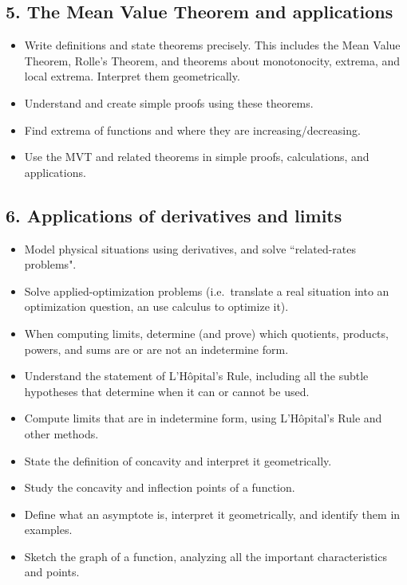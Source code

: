 \documentclass[11pt]{article}
\begin{document}
\subsection{5. The Mean Value Theorem and applications} \label{unit5}

	\begin{itemize}
		\item  Write definitions and state theorems precisely.  This includes the Mean Value Theorem, Rolle's Theorem, and theorems about monotonocity, extrema, and local extrema.  Interpret them geometrically.
		
		\item  Understand and create simple proofs using these theorems.
		
		\item   Find extrema of functions and where they are increasing/decreasing.
		
		\item Use the MVT and related theorems in simple proofs, calculations, and applications.
	\end{itemize}

\subsection{6. Applications of derivatives and limits} \label{unit6}

	\begin{itemize}
		\item  Model physical situations using derivatives, and solve ``related-rates problems".  
		\item  Solve applied-optimization problems (i.e.\ translate a real situation into an optimization question, an use calculus to optimize it).
		\item When computing limits, determine (and prove) which quotients, products, powers, and sums are or are not an indetermine form.
		\item Understand the statement of L'H\^{o}pital's Rule, including all the subtle hypotheses that determine when it can or cannot be used.
		\item Compute limits that are in indetermine form, using L'H\^{o}pital's Rule and other methods.
		\item State the definition of concavity and interpret it geometrically.
		\item Study the concavity and inflection points of a function.
		\item Define what an asymptote is, interpret it geometrically, and identify them in examples.
		\item Sketch the graph of a function, analyzing all the important characteristics and points.
	\end{itemize}
\end{document}

